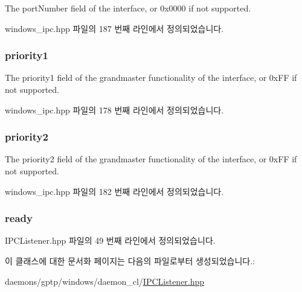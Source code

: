 The port\+Number field of the interface, or 0x0000 if not supported. 



windows\+\_\+ipc.\+hpp 파일의 187 번째 라인에서 정의되었습니다.

\subsubsection[{\texorpdfstring{priority1}{priority1}}]{ priority1\hspace{0.3cm}{\ttfamily [inherited]}}\hypertarget{class_offset_af98f08e3d1b016cd549310197ba8673c}{}\label{class_offset_af98f08e3d1b016cd549310197ba8673c}


The priority1 field of the grandmaster functionality of the interface, or 0x\+FF if not supported. 



windows\+\_\+ipc.\+hpp 파일의 178 번째 라인에서 정의되었습니다.

\subsubsection[{\texorpdfstring{priority2}{priority2}}]{ priority2\hspace{0.3cm}{\ttfamily [inherited]}}\hypertarget{class_offset_ac04b889463a96b43985cb82020e3c39b}{}\label{class_offset_ac04b889463a96b43985cb82020e3c39b}


The priority2 field of the grandmaster functionality of the interface, or 0x\+FF if not supported. 



windows\+\_\+ipc.\+hpp 파일의 182 번째 라인에서 정의되었습니다.

\subsubsection[{\texorpdfstring{ready}{ready}}]{ ready\hspace{0.3cm}{\ttfamily [private]}}\hypertarget{class_lockable_offset_a65cf7d7f8e531611b245355ab91fd749}{}\label{class_lockable_offset_a65cf7d7f8e531611b245355ab91fd749}


I\+P\+C\+Listener.\+hpp 파일의 49 번째 라인에서 정의되었습니다.



이 클래스에 대한 문서화 페이지는 다음의 파일로부터 생성되었습니다.\+:\begin{DoxyCompactItemize}
\item 
daemons/gptp/windows/daemon\+\_\+cl/\hyperlink{_i_p_c_listener_8hpp}{I\+P\+C\+Listener.\+hpp}\end{DoxyCompactItemize}
